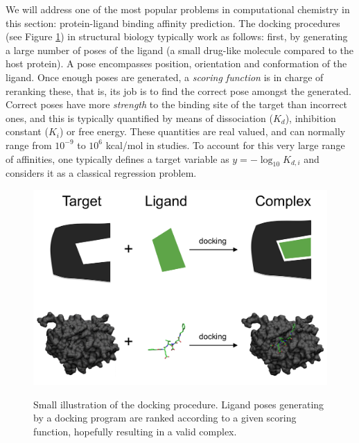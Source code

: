 \documentclass[10pt,a4paper,twoside]{book}
\begin{document}
We will address one of the most popular problems in computational chemistry in this section: protein-ligand binding affinity prediction. The docking procedures (see Figure \ref{fig:docking}) in structural biology typically work as follows: first, by generating a large number of poses of the ligand (a small drug-like molecule compared to the host protein). A pose encompasses position, orientation and conformation of the ligand. Once enough poses are generated, a \textit{scoring function} is in charge of reranking these, that is, its job is to find the correct pose amongst the generated. Correct poses have more \textit{strength} to the binding site of the target than incorrect ones, and this is typically quantified by means of dissociation ($K_d$), inhibition constant ($K_i$) or free energy. These quantities are real valued, and can normally range from $10^{-9}$ to $10^6$ kcal/mol in studies. To account for this very large range of affinities, one typically defines a target variable as $y=-\log_{10}K_{d,i}$ and considers it as a classical regression problem.\\

\begin{figure}
\centering
\caption{Small illustration of the docking procedure. Ligand poses generating by a docking program are ranked according to a given scoring function, hopefully resulting in a valid complex.}
\includegraphics[scale=0.45]{figures/chapter4/docking}
\label{fig:docking}
\end{figure}
\end{document}
